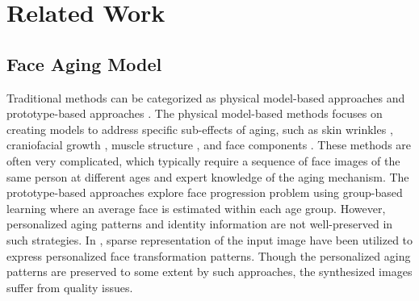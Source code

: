 \documentclass[final]{cvpr}
\begin{document}
\section{Related Work}
\subsection{Face Aging Model} 
Traditional methods can be categorized as physical model-based approaches \cite{boissieux2000simulation,wu1994plastic,suo2012concatenational} and prototype-based approaches \cite{rowland1995manipulating,tiddeman2001prototyping,kemelmacher2014illumination,lanitis2002toward}. The physical model-based methods focuses on creating models to address specific sub-effects of aging, such as skin wrinkles \cite{wu1994plastic,bando2002simple,boissieux2000simulation}, craniofacial growth \cite{todd1980perception,ramanathan2006modeling}, muscle structure \cite{suo2012concatenational,ramanathan2008modeling}, and face components \cite{suo2007multi,suo2009compositional}. These methods are often very complicated, which typically require a sequence of face images of the same person at different ages and expert knowledge of the aging mechanism. The prototype-based approaches \cite{rowland1995manipulating,tiddeman2001prototyping,burt1995perception} explore face progression problem using group-based learning where an average face is estimated within each age group. However, personalized aging patterns and identity information are not well-preserved in such strategies. In \cite{wang2016category,yang2016face,shu2015personalized}, sparse representation of the input image have been utilized to express personalized face transformation patterns. Though the personalized aging patterns are preserved to some extent by such approaches, the synthesized images suffer from quality issues.
\end{document}
